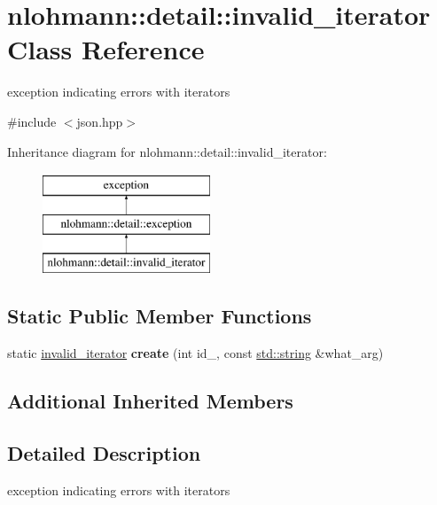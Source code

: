 \hypertarget{classnlohmann_1_1detail_1_1invalid__iterator}{}\section{nlohmann\+:\+:detail\+:\+:invalid\+\_\+iterator Class Reference}
\label{classnlohmann_1_1detail_1_1invalid__iterator}


exception indicating errors with iterators  




{\ttfamily \#include $<$json.\+hpp$>$}

Inheritance diagram for nlohmann\+:\+:detail\+:\+:invalid\+\_\+iterator\+:\begin{figure}[H]
\begin{center}
\leavevmode
\includegraphics[height=3.000000cm]{classnlohmann_1_1detail_1_1invalid__iterator}
\end{center}
\end{figure}
\subsection*{Static Public Member Functions}
\begin{DoxyCompactItemize}
\item 
\mbox{\label{classnlohmann_1_1detail_1_1invalid__iterator_a4e849260a3caa1b288c7e619130c6c09}} 
static \mbox{\hyperlink{classnlohmann_1_1detail_1_1invalid__iterator}{invalid\+\_\+iterator}} {\bfseries create} (int id\+\_\+, const \mbox{\hyperlink{namespacenlohmann_1_1detail_a1ed8fc6239da25abcaf681d30ace4985ab45cffe084dd3d20d928bee85e7b0f21}{std\+::string}} \&what\+\_\+arg)
\end{DoxyCompactItemize}
\subsection*{Additional Inherited Members}


\subsection{Detailed Description}
exception indicating errors with iterators 

